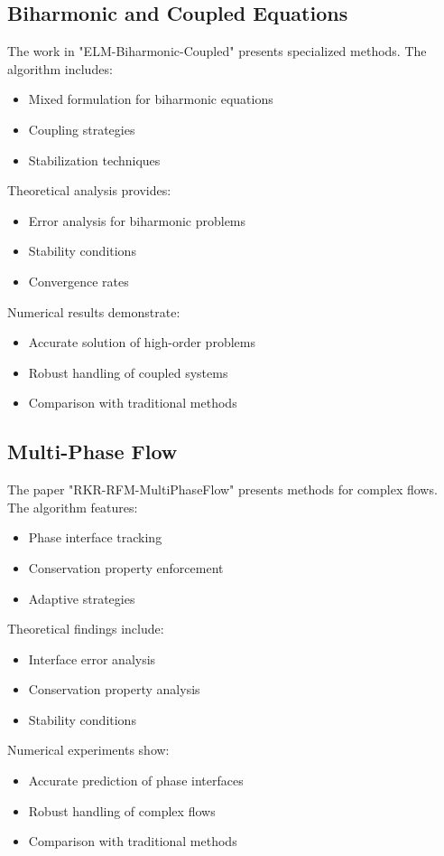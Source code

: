 \documentclass[12pt]{article}
\begin{document}
\subsection{Biharmonic and Coupled Equations}
\label{subsec:biharmonic}
The work in "ELM-Biharmonic-Coupled" presents specialized methods. The algorithm includes:
\begin{itemize}
    \item Mixed formulation for biharmonic equations
    \item Coupling strategies
    \item Stabilization techniques
\end{itemize}
Theoretical analysis provides:
\begin{itemize}
    \item Error analysis for biharmonic problems
    \item Stability conditions
    \item Convergence rates
\end{itemize}
Numerical results demonstrate:
\begin{itemize}
    \item Accurate solution of high-order problems
    \item Robust handling of coupled systems
    \item Comparison with traditional methods
\end{itemize}

\subsection{Multi-Phase Flow}
\label{subsec:multiphase}
The paper "RKR-RFM-MultiPhaseFlow" presents methods for complex flows. The algorithm features:
\begin{itemize}
    \item Phase interface tracking
    \item Conservation property enforcement
    \item Adaptive strategies
\end{itemize}
Theoretical findings include:
\begin{itemize}
    \item Interface error analysis
    \item Conservation property analysis
    \item Stability conditions
\end{itemize}
Numerical experiments show:
\begin{itemize}
    \item Accurate prediction of phase interfaces
    \item Robust handling of complex flows
    \item Comparison with traditional methods
\end{itemize}
\end{document}
